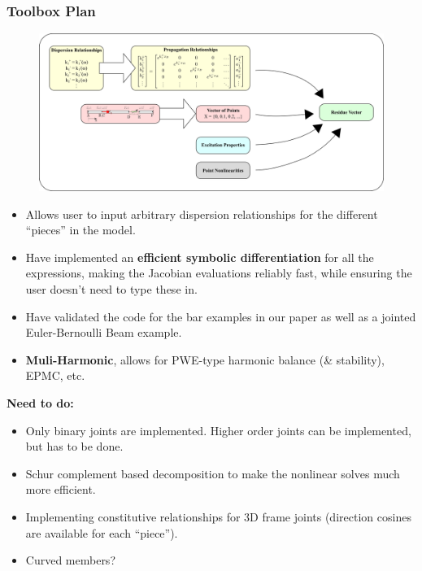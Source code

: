 \documentclass{beamertmd}
\begin{document}
\begin{frame}[allowframebreaks]
  \frametitle{Toolbox Plan}
  \begin{figure}
    \centering
    \includegraphics[width=\linewidth]{FIGS/rep1_SWPlan}
  \end{figure}
  \pagebreak
  \begin{itemize}
  \item Allows user to input arbitrary dispersion relationships for
    the different ``pieces'' in the model.
  \item Have implemented an \textbf{efficient symbolic
      differentiation} for all the expressions, making the Jacobian
    evaluations reliably fast, while ensuring the user doesn't need to
    type these in.
  \item Have validated the code for the bar examples in our paper as
    well as a jointed Euler-Bernoulli Beam example. 
  \item \textbf{Muli-Harmonic}, allows for PWE-type harmonic balance
    (\& stability), EPMC, etc.
  \end{itemize}
  \pagebreak
  \textbf{Need to do:}
  \begin{itemize}
  \item Only binary joints are implemented. Higher order joints can be
    implemented, but has to be done. 
  \item Schur complement based decomposition to make the nonlinear
    solves much more efficient. 
  \item Implementing constitutive relationships for 3D frame joints
    (direction cosines are available for each ``piece''). 
  \item Curved members?
  \end{itemize}
\end{frame}
\end{document}
